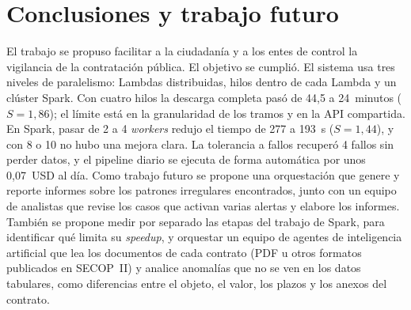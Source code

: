 \documentclass[conference]{IEEEtran}
\begin{document}
\section{Conclusiones y trabajo futuro}
El trabajo se propuso facilitar a la ciudadanía y a los entes de control la vigilancia de la contratación pública. El objetivo se cumplió. El sistema usa tres niveles de paralelismo: Lambdas distribuidas, hilos dentro de cada Lambda y un clúster Spark. Con cuatro hilos la descarga completa pasó de 44,5 a 24~minutos ($S = 1{,}86$); el límite está en la granularidad de los tramos y en la API compartida. En Spark, pasar de 2 a 4 \textit{workers} redujo el tiempo de 277 a 193~s ($S = 1{,}44$), y con 8 o 10 no hubo una mejora clara. La tolerancia a fallos recuperó 4 fallos sin perder datos, y el pipeline diario se ejecuta de forma automática por unos 0,07~USD al día. Como trabajo futuro se propone una orquestación que genere y reporte informes sobre los patrones irregulares encontrados, junto con un equipo de analistas que revise los casos que activan varias alertas y elabore los informes. También se propone medir por separado las etapas del trabajo de Spark, para identificar qué limita su \textit{speedup}, y orquestar un equipo de agentes de inteligencia artificial que lea los documentos de cada contrato (PDF u otros formatos publicados en SECOP~II) y analice anomalías que no se ven en los datos tabulares, como diferencias entre el objeto, el valor, los plazos y los anexos del contrato.
\end{document}
